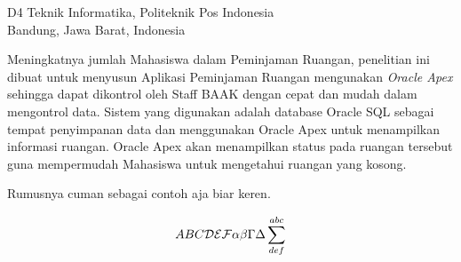 

{D4 Teknik Informatika, Politeknik Pos Indonesia\\
Bandung, Jawa Barat, Indonesia}

Meningkatnya jumlah Mahasiswa dalam Peminjaman Ruangan, penelitian ini dibuat untuk menyusun Aplikasi Peminjaman Ruangan mengunakan \textit{Oracle Apex} sehingga dapat dikontrol oleh Staff BAAK dengan cepat  dan mudah dalam mengontrol data. Sistem yang digunakan adalah database Oracle SQL sebagai tempat penyimpanan data dan menggunakan Oracle Apex untuk menampilkan informasi ruangan. Oracle Apex akan menampilkan status pada ruangan tersebut guna mempermudah Mahasiswa untuk mengetahui ruangan yang kosong.

Rumusnya cuman sebagai contoh aja biar keren\cite{awangga2018sampeu}.

\begin{equation}
ABC {\cal DEF} \alpha\beta\Gamma\Delta\sum^{abc}_{def}
\end{equation}
